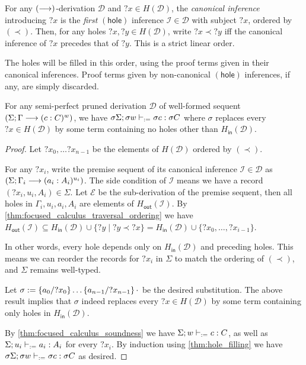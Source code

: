\documentclass[twoside]{report}
\begin{document}
\begin{definition}
    \label{def:focused_calculus_hole_ordering}
    For any $(\vdashf)$-derivation $\mathcal D$ and ${?x} \in H(\mathcal D)$, the \emph{canonical inference} introducing ${?x}$ is the \emph{first} $(\mathsf{hole})$ inference $\mathcal I \in \mathcal D$ with subject ${?x}$, ordered by $(\prec)$. Then, for any holes ${?x}, {?y} \in H(\mathcal D)$, write ${?x} \prec {?y}$ iff the canonical inference of ${?x}$ precedes that of ${?y}$. This is a strict linear order.
\end{definition}

The holes will be filled in this order, using the proof terms given in their canonical inferences. Proof terms given by non-canonical $(\mathsf{hole})$ inferences, if any, are simply discarded.

\begin{proposition}
    \label{thm:focused_calculus_semi_perfect_term_assignment}
    For any semi-perfect pruned derivation $\mathcal D$ of well-formed sequent $(\Sigma; \Gamma \vdashf (c : C)^w)$, we have $\sigma \Sigma; \sigma w \vdashd \sigma c : \sigma C$ where $\sigma$ replaces every ${?x} \in H(\mathcal D)$ by some term containing no holes other than $H_{\mathsf{in}}(\mathcal D)$.
\end{proposition}

\begin{proof}
    Let ${?x_0}, \ldots {?x_{n-1}}$ be the elements of $H(\mathcal D)$ ordered by $(\prec)$.

    For any ${?x_i}$, write the premise sequent of its canonical inference $\mathcal I \in \mathcal D$ as $(\Sigma; \Gamma_i \vdashf (a_i : A_i)^{u_i})$. The side condition of $\mathcal I$ means we have a record $({?x_i}, u_i, A_i) \in \Sigma$. Let $\mathcal E$ be the sub-derivation of the premise sequent, then all holes in $\Gamma_i, u_i, a_i, A_i$ are elements of $H_{\mathsf{out}}(\mathcal I)$. By \cref{thm:focused_calculus_traversal_ordering} we have $H_{\mathsf{out}}(\mathcal I) \subseteq H_{\mathsf{in}}(\mathcal D) \cup \{{?y} \mid {?y} \prec {?x}\} = H_{\mathsf{in}}(\mathcal D) \cup \{{?x_0}, \ldots, {?x_{i-1}}\}$.

    In other words, every hole depends only on $H_{\mathsf{in}}(\mathcal D)$ and preceding holes. This means we can reorder the records for ${?x_i}$ in $\Sigma$ to match the ordering of $(\prec)$, and $\Sigma$ remains well-typed.

    Let $\sigma \defeq \subst {?x_0} {a_0} {\ldots \subst {?x_{n-1}} {a_{n-1}} {\cdot}}$ be the desired substitution. The above result implies that $\sigma$ indeed replaces every ${?x} \in H(\mathcal D)$ by some term containing only holes in $H_{\mathsf{in}}(\mathcal D)$.

    By \cref{thm:focused_calculus_soundness} we have $\Sigma; w \vdashd c : C$, as well as $\Sigma; u_i \vdashd a_i : A_i$ for every ${?x_i}$. By induction using \cref{thm:hole_filling} we have $\sigma \Sigma; \sigma w \vdashd \sigma c : \sigma C$ as desired.
\end{proof}
\end{document}
